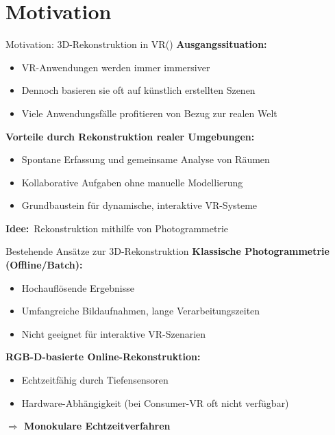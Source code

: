 \section{Motivation}\sectionFrame

\begin{frame}{Motivation: 3D-Rekonstruktion in VR}{(\cite{enhancinginteractions,Stotko_2019,khenak2020spatial})}
    \textbf{Ausgangssituation:}
    \begin{itemize}
        \item VR-Anwendungen werden immer immersiver
        \item Dennoch basieren sie oft auf künstlich erstellten Szenen
        \item Viele Anwendungsfälle profitieren von Bezug zur realen Welt
    \end{itemize}
    
    \vfill
    
    \textbf{Vorteile durch Rekonstruktion realer Umgebungen:}
    \begin{itemize}
        \item Spontane Erfassung und gemeinsame Analyse von Räumen
        \item Kollaborative Aufgaben ohne manuelle Modellierung
        \item Grundbaustein für dynamische, interaktive VR-Systeme
    \end{itemize}

    \vfill

    \begin{tcolorbox}[box5]
        \centering
        \textbf{Idee:}~Rekonstruktion mithilfe von Photogrammetrie
    \end{tcolorbox}
\end{frame}

\begin{frame}{Bestehende Ansätze zur 3D-Rekonstruktion}
    \textbf{Klassische Photogrammetrie (Offline/Batch):}
    \begin{itemize}
        \item Hochauflösende Ergebnisse
        \item Umfangreiche Bildaufnahmen, lange Verarbeitungszeiten
        \item Nicht geeignet für interaktive VR-Szenarien
    \end{itemize}
    
    \vfill
    
    \textbf{RGB-D-basierte Online-Rekonstruktion:}
    \begin{itemize}
        \item Echtzeitfähig durch Tiefensensoren
        \item Hardware-Abhängigkeit (bei Consumer-VR oft nicht verfügbar)
    \end{itemize}
    
    \vfill
    
    \textbf{$\Longrightarrow$ Monokulare Echtzeitverfahren}
\end{frame}

